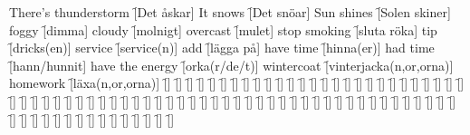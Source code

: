 \begin{questions}
\begin{multicols}{2}
        \question There's thunderstorm \f[Det åskar]
        \question It snows \f[Det snöar]
        \question Sun shines \f[Solen skiner]
        \question foggy \f[dimma]
        \question cloudy \f[molnigt]
        \question overcast \f[mulet]
        \question stop smoking \f[sluta röka]
        \question tip \f[dricks(en)]
        \question service \f[service(n)]
        \question add \f[lägga på]
        \question have time \f[hinna(er)]
        \question had time \f[hann/hunnit]
        \question have the energy \f[orka(r/de/t)]
        \question wintercoat \f[vinterjacka(n,or,orna)]
        \question homework \f[läxa(n,or,orna)]
        \question  \f[]
        \question  \f[]
        \question  \f[]
        \question  \f[]
        \question  \f[]
        \question  \f[]
        \question  \f[]
        \question  \f[]
        \question  \f[]
        \question  \f[]
        \question  \f[]
        \question  \f[]
        \question  \f[]
        \question  \f[]
        \question  \f[]
        \question  \f[]
        \question  \f[]
        \question  \f[]
        \question  \f[]
        \question  \f[]
        \question  \f[]
        \question  \f[]
        \question  \f[]
        \question  \f[]
        \question  \f[]
        \question  \f[]
        \question  \f[]
        \question  \f[]
        \question  \f[]
        \question  \f[]
        \question  \f[]
        \question  \f[]
        \question  \f[]
        \question  \f[]
        \question  \f[]
        \question  \f[]
        \question  \f[]
        \question  \f[]
        \question  \f[]
        \question  \f[]
        \question  \f[]
        \question  \f[]
        \question  \f[]
        \question  \f[]
        \question  \f[]
        \question  \f[]
        \question  \f[]
        \question  \f[]
        \question  \f[]
        \question  \f[]
        \question  \f[]
        \question  \f[]
        \question  \f[]
        \question  \f[]
        \question  \f[]
        \question  \f[]
        \question  \f[]
        \question  \f[]
        \question  \f[]
        \question  \f[]
        \question  \f[]
        \question  \f[]
        \question  \f[]
        \question  \f[]
        \question  \f[]
        \question  \f[]
        \question  \f[]
        \question  \f[]
        \question  \f[]
        \question  \f[]
        \question  \f[]
        \question  \f[]
        \question  \f[]
        \question  \f[]
        \question  \f[]
        \question  \f[]
        \question  \f[]
        \question  \f[]
        \question  \f[]
        \question  \f[]
        \question  \f[]
        \question  \f[]

\end{multicols}
\end{questions}
